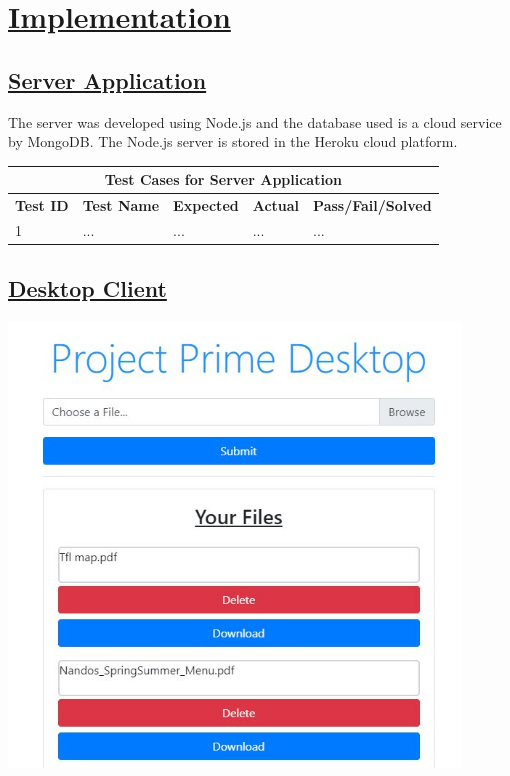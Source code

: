 \documentclass{article}
\begin{document}
\section{\underline{Implementation}}
\subsection{\underline{Server Application}}
The server was developed using Node.js and the database used is a cloud service by MongoDB. The Node.js server is stored in the Heroku cloud platform.

\begin{tabular}{|p{2cm}|p{2cm}|p{3cm}|p{3cm}|p{3cm}|}
\hline
\multicolumn{5}{|c|}{\textbf{Test Cases for Server Application}} \\
\hline
\textbf{Test ID} & \textbf{Test Name} & \textbf{Expected} & \textbf{Actual} & \textbf{Pass/Fail/Solved} \\
\hline
1 & ... & ... & ... & ... \\
\hline
\end{tabular}

\subsection{\underline{Desktop Client}}
\includegraphics[width=12cm]{frontEnd}
\end{document}
